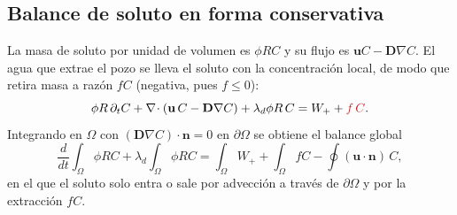 \documentclass[11pt]{article}
\numberwithin{equation}{section}
\theoremstyle{plain}
\theoremstyle{definition}
\theoremstyle{remark}
\newcommand{\bu}{\mathbf{u}}
\newcommand{\bD}{\mathbf{D}}
\newcommand{\bn}{\mathbf{n}}
\newcommand{\sumi}[1]{{\color{cSum}#1}}
\begin{document}
\subsection{Balance de soluto en forma conservativa}
La masa de soluto por unidad de volumen es $\phi RC$ y su flujo es $\bu C-\bD\nabla C$. El agua que extrae el
pozo se lleva el soluto con la concentración local, de modo que retira masa a razón $fC$ (negativa, pues $f\le0$):
\begin{equation}
\phi R\,\partial_tC+\nabla\!\cdot(\bu\,C-\bD\nabla C)+\lambda_d\phi R\,C
=W_++\sumi{f\,C}.
\label{eq:conservativa}
\end{equation}
Integrando en $\Omega$ con $(\bD\nabla C)\cdot\bn=0$ en $\partial\Omega$ se obtiene el balance global
\begin{equation}
\frac{d}{dt}\int_\Omega\phi RC+\lambda_d\!\int_\Omega\phi RC=\int_\Omega W_++\int_\Omega fC-\oint(\bu\cdot\bn)\,C ,
\label{eq:balance_global}
\end{equation}
en el que el soluto solo entra o sale por advección a través de $\partial\Omega$ y por la extracción $fC$.
\end{document}
